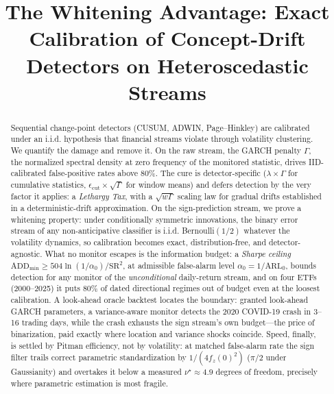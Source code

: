 \documentclass[sigconf,anonymous,review]{acmart}
\title[The Whitening Advantage]{The Whitening Advantage: Exact Calibration of Concept-Drift Detectors on Heteroscedastic Streams}
\theoremstyle{acmdefinition}
\begin{document}
\begin{abstract}
    Sequential change-point detectors (CUSUM, ADWIN, Page--Hinkley) are calibrated under an i.i.d. hypothesis that financial streams violate through volatility clustering. We quantify the damage and remove it. On the raw stream, the GARCH penalty $\Gamma$, the normalized spectral density at zero frequency of the monitored statistic, drives IID-calibrated false-positive rates above 80\%. The cure is detector-specific ($\lambda \times \Gamma$ for cumulative statistics, $\epsilon_{\mathrm{cut}} \times \sqrt{\Gamma}$ for window means) and defers detection by the very factor it applies: a \emph{Lethargy Tax}, with a $\sqrt{w\Gamma}$ scaling law for gradual drifts established in a deterministic-drift approximation. On the sign-prediction stream, we prove a whitening property: under conditionally symmetric innovations, the binary error stream of any non-anticipative classifier is i.i.d. Bernoulli$(1/2)$ whatever the volatility dynamics, so calibration becomes exact, distribution-free, and detector-agnostic. What no monitor escapes is the information budget: a \emph{Sharpe ceiling} $\mathrm{ADD}_{\min} \ge 504\ln(1/\alpha_0)/\mathrm{SR}^2$, at admissible false-alarm level $\alpha_0 = 1/\mathrm{ARL}_0$, bounds detection for any monitor of the \emph{unconditional} daily-return stream, and on four ETFs (2000--2025) it puts 80\% of dated directional regimes out of budget even at the loosest calibration. A look-ahead oracle backtest locates the boundary: granted look-ahead GARCH parameters, a variance-aware monitor detects the 2020 COVID-19 crash in 3--16 trading days, while the crash exhausts the sign stream's own budget---the price of binarization, paid exactly where location and variance shocks coincide. Speed, finally, is settled by Pitman efficiency, not by volatility: at matched false-alarm rate the sign filter trails correct parametric standardization by $1/(4f_z(0)^2)$ ($\pi/2$ under Gaussianity) and overtakes it below a measured $\nu^{\star} \approx 4.9$ degrees of freedom, precisely where parametric estimation is most fragile.
\end{abstract}


\end{document}
